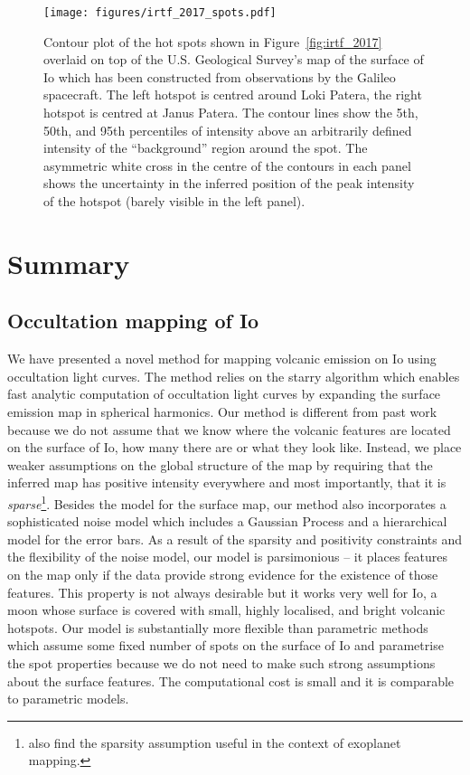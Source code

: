 \documentclass[12pt,dvipsnames]{report}
\begin{document}
\begin{figure}[t!]
    \begin{centering}
    \texttt{[image: figures/irtf\_2017\_spots.pdf]}
    \caption{
        Contour plot of the hot spots shown in Figure~\ref{fig:irtf_2017} overlaid on top of the U.S. Geological Survey's map of the surface of Io which has been constructed from observations by the Galileo spacecraft.
        The left hotspot is centred around Loki Patera, the right hotspot is centred at Janus Patera.
The contour lines show the 5th, 50th, and 95th percentiles of intensity above an arbitrarily defined intensity of the ``background'' region around the spot.
        The asymmetric white cross in the centre of the contours in each panel shows the uncertainty in the inferred position of the peak intensity of the hotspot (barely visible in the left panel).
    }
        \label{fig:irtf_2017_spots}
    \end{centering}
\end{figure}


\section{Summary}
\label{sec:io_summary}
\subsection{Occultation mapping of Io}
We have presented a novel method for mapping volcanic emission on Io using occultation light curves.
The method relies on the \textsf{starry} algorithm which enables fast analytic computation of occultation light curves by expanding the surface emission map in spherical harmonics.
Our method is different from past work because we do not assume that we know where the volcanic features are located on the surface of Io, how many there are or what they look like.
Instead, we place weaker assumptions on the global structure of the map by requiring that the inferred map has positive intensity everywhere and most importantly, that it is 
\emph{sparse}\footnote{\citet{aizawa2020} also find the sparsity assumption useful in the context of exoplanet mapping.}.
Besides the model for the surface map, our method also incorporates a sophisticated noise model which includes a Gaussian Process and a hierarchical model for the error bars.
As a result of the sparsity and positivity constraints and the flexibility of the noise model,
our model is parsimonious -- it places features on the map only if the data provide strong evidence for the existence of those features.
This property is not always desirable but it works very well for Io, a moon whose surface is covered with small, highly localised, and bright volcanic hotspots.
Our model is substantially more flexible than parametric methods which assume some fixed number of spots on the surface of Io and parametrise the spot properties because we do not need to make such strong assumptions about the surface features.
The computational cost is small and it is comparable to parametric models.
\end{document}
